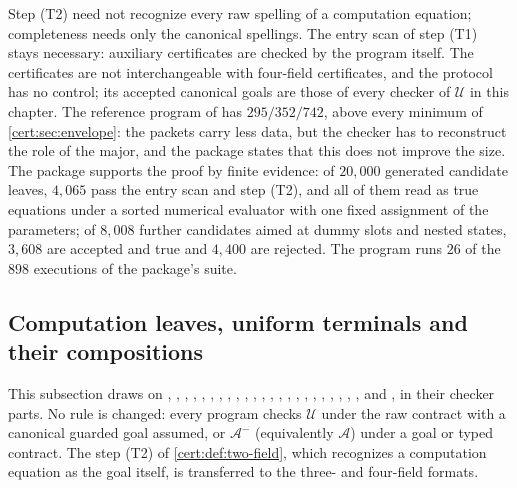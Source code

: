 Step (T2) need not recognize every raw spelling of a computation equation;
completeness needs only the canonical spellings. The entry scan of step (T1)
stays necessary: auxiliary certificates are checked by the program itself.
The certificates are not interchangeable with four-field certificates, and
the protocol has no control; its accepted canonical goals are those of every
checker of $\mathcal U$ in this chapter. The reference program of
 has $295/352/742$, above every minimum of
\cref{cert:sec:envelope}: the packets carry less data, but the checker has to
reconstruct the role of the major, and the package states that this does not
improve the size. The package supports the proof by finite evidence: of
$20{,}000$ generated candidate leaves, $4{,}065$ pass the entry scan and step
(T2), and all of them read as true equations under a sorted numerical
evaluator with one fixed assignment of the parameters; of $8{,}008$ further
candidates aimed at dummy slots and nested states, $3{,}608$ are accepted and
true and $4{,}400$ are rejected. The program runs $26$ of the $898$
executions of the package's suite.

\subsection{Computation leaves, uniform terminals and their compositions}\label{cert:sec:leaves}

This subsection draws on , ,
, ,
, ,
, ,
, ,
, ,
, , ,
, , ,
, ,
, , ,
 and , in their checker
parts. No rule is
changed: every program checks $\mathcal U$ under the raw contract with a
canonical guarded goal assumed, or $\mathcal A^{-}$ (equivalently
$\mathcal A$) under a goal or typed contract. The step (T2) of
\cref{cert:def:two-field}, which recognizes a computation equation as the goal
itself, is transferred to the three- and four-field formats.

